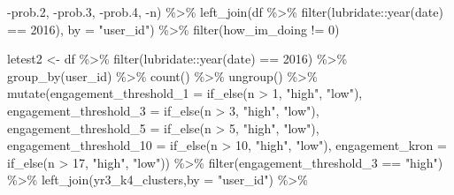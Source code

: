 \documentclass[
]{article}
\newenvironment{Shaded}{\begin{snugshade}}{\end{snugshade}}
\newcommand{\AttributeTok}[1]{\textcolor[rgb]{0.77,0.63,0.00}{#1}}
\newcommand{\DecValTok}[1]{\textcolor[rgb]{0.00,0.00,0.81}{#1}}
\newcommand{\FloatTok}[1]{\textcolor[rgb]{0.00,0.00,0.81}{#1}}
\newcommand{\FunctionTok}[1]{\textcolor[rgb]{0.00,0.00,0.00}{#1}}
\newcommand{\NormalTok}[1]{#1}
\newcommand{\OtherTok}[1]{\textcolor[rgb]{0.56,0.35,0.01}{#1}}
\newcommand{\SpecialCharTok}[1]{\textcolor[rgb]{0.00,0.00,0.00}{#1}}
\newcommand{\StringTok}[1]{\textcolor[rgb]{0.31,0.60,0.02}{#1}}
\begin{document}
\begin{Shaded}
\begin{Highlighting}[]
          \SpecialCharTok{{-}}\NormalTok{prob}\FloatTok{.2}\NormalTok{,}
          \SpecialCharTok{{-}}\NormalTok{prob}\FloatTok{.3}\NormalTok{,}
          \SpecialCharTok{{-}}\NormalTok{prob}\FloatTok{.4}\NormalTok{,}
          \SpecialCharTok{{-}}\NormalTok{n) }\SpecialCharTok{\%\textgreater{}\%} 
  \FunctionTok{left\_join}\NormalTok{(df }\SpecialCharTok{\%\textgreater{}\%}
  \FunctionTok{filter}\NormalTok{(lubridate}\SpecialCharTok{::}\FunctionTok{year}\NormalTok{(date) }\SpecialCharTok{==} \DecValTok{2016}\NormalTok{),}
         \AttributeTok{by =} \StringTok{"user\_id"}\NormalTok{) }\SpecialCharTok{\%\textgreater{}\%}
  \FunctionTok{filter}\NormalTok{(how\_im\_doing }\SpecialCharTok{!=} \DecValTok{0}\NormalTok{)}


\NormalTok{letest2 }\OtherTok{\textless{}{-}}\NormalTok{  df }\SpecialCharTok{\%\textgreater{}\%}
  \FunctionTok{filter}\NormalTok{(lubridate}\SpecialCharTok{::}\FunctionTok{year}\NormalTok{(date) }\SpecialCharTok{==} \DecValTok{2016}\NormalTok{) }\SpecialCharTok{\%\textgreater{}\%}
  \FunctionTok{group\_by}\NormalTok{(user\_id) }\SpecialCharTok{\%\textgreater{}\%}
  \FunctionTok{count}\NormalTok{() }\SpecialCharTok{\%\textgreater{}\%}
  \FunctionTok{ungroup}\NormalTok{() }\SpecialCharTok{\%\textgreater{}\%} 
  \FunctionTok{mutate}\NormalTok{(}\AttributeTok{engagement\_threshold\_1 =} \FunctionTok{if\_else}\NormalTok{(n }\SpecialCharTok{\textgreater{}} \DecValTok{1}\NormalTok{, }\StringTok{"high"}\NormalTok{, }\StringTok{"low"}\NormalTok{),}
         \AttributeTok{engagement\_threshold\_3 =} \FunctionTok{if\_else}\NormalTok{(n }\SpecialCharTok{\textgreater{}} \DecValTok{3}\NormalTok{, }\StringTok{"high"}\NormalTok{, }\StringTok{"low"}\NormalTok{),}
         \AttributeTok{engagement\_threshold\_5 =} \FunctionTok{if\_else}\NormalTok{(n }\SpecialCharTok{\textgreater{}} \DecValTok{5}\NormalTok{, }\StringTok{"high"}\NormalTok{, }\StringTok{"low"}\NormalTok{),}
         \AttributeTok{engagement\_threshold\_10 =} \FunctionTok{if\_else}\NormalTok{(n }\SpecialCharTok{\textgreater{}} \DecValTok{10}\NormalTok{, }\StringTok{"high"}\NormalTok{, }\StringTok{"low"}\NormalTok{),}
         \AttributeTok{engagement\_kron =} \FunctionTok{if\_else}\NormalTok{(n }\SpecialCharTok{\textgreater{}} \DecValTok{17}\NormalTok{, }\StringTok{"high"}\NormalTok{, }\StringTok{"low"}\NormalTok{)) }\SpecialCharTok{\%\textgreater{}\%} 
  \FunctionTok{filter}\NormalTok{(engagement\_threshold\_3 }\SpecialCharTok{==} \StringTok{"high"}\NormalTok{) }\SpecialCharTok{\%\textgreater{}\%} 
  \FunctionTok{left\_join}\NormalTok{(yr3\_k4\_clusters,}\AttributeTok{by =} \StringTok{"user\_id"}\NormalTok{) }\SpecialCharTok{\%\textgreater{}\%} 

\end{Highlighting}
\end{Shaded}
\end{document}
